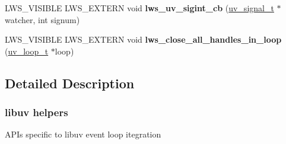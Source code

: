 \begin{DoxyCompactItemize}
\item 
\mbox{\label{group__uv_gac5f60dba13a45e5d554b4fb7df7b9610}} 
L\+W\+S\+\_\+\+V\+I\+S\+I\+B\+LE L\+W\+S\+\_\+\+E\+X\+T\+E\+RN void {\bfseries lws\+\_\+uv\+\_\+sigint\+\_\+cb} (\hyperlink{structuv__signal__s}{uv\+\_\+signal\+\_\+t} $\ast$watcher, int signum)
\item 
\mbox{\label{group__uv_ga45608b26a61a0dae91048e73c5d34f6d}} 
L\+W\+S\+\_\+\+V\+I\+S\+I\+B\+LE L\+W\+S\+\_\+\+E\+X\+T\+E\+RN void {\bfseries lws\+\_\+close\+\_\+all\+\_\+handles\+\_\+in\+\_\+loop} (\hyperlink{structuv__loop__s}{uv\+\_\+loop\+\_\+t} $\ast$loop)
\end{DoxyCompactItemize}


\subsection{Detailed Description}
\subsubsection*{libuv helpers}

A\+P\+Is specific to libuv event loop itegration 